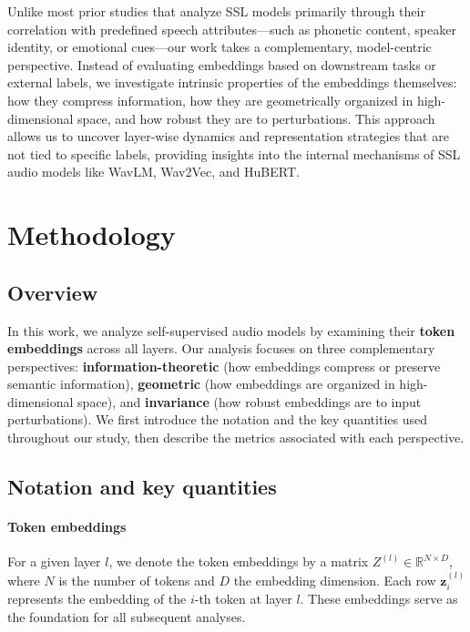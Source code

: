 \documentclass[5p]{elsarticle}
\begin{document}
Unlike most prior studies \citep{chiu2025probing} that analyze SSL models primarily through their correlation with predefined speech attributes—such as phonetic content, speaker identity, or emotional cues—our work takes a complementary, model-centric perspective. Instead of evaluating embeddings based on downstream tasks or external labels, we investigate intrinsic properties of the embeddings themselves: how they compress information, how they are geometrically organized in high-dimensional space, and how robust they are to perturbations. This approach allows us to uncover layer-wise dynamics and representation strategies that are not tied to specific labels, providing insights into the internal mechanisms of SSL audio models like WavLM, Wav2Vec, and HuBERT.



\section{Methodology}
\label{sec:methodology}

\subsection{Overview}

In this work, we analyze self-supervised audio models by examining their \textbf{token embeddings} across all layers. 
Our analysis focuses on three complementary perspectives: 
\textbf{information-theoretic} (how embeddings compress or preserve semantic information), 
\textbf{geometric} (how embeddings are organized in high-dimensional space), and 
\textbf{invariance} (how robust embeddings are to input perturbations). 
We first introduce the notation and the key quantities used throughout our study, then describe the metrics associated with each perspective.

\subsection{Notation and key quantities}
\label{sec:notation}
\paragraph{Token embeddings} 
For a given layer $l$, we denote the token embeddings by a matrix $Z^{(l)} \in \mathbb{R}^{N \times D}$, 
where $N$ is the number of tokens and $D$ the embedding dimension. 
Each row $\mathbf{z}_i^{(l)}$ represents the embedding of the $i$-th token at layer $l$. 
These embeddings serve as the foundation for all subsequent analyses.
\end{document}
